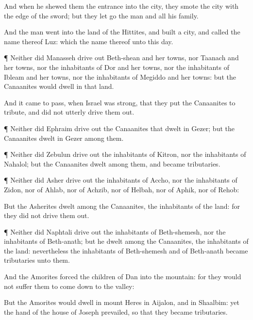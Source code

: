 {And when he
shewed them the
entrance into the
city, they
smote the
city with the
edge of the
sword; but they let
go the
man and all his
family.

And the
man
went into the
land of the
Hittites, and
built a
city, and
called the
name thereof
Luz: which
{} the
name thereof unto this
day.


\par }{\PP {}¶ Neither did
Manasseh drive
out
{}
Beth-shean and her
towns, nor
Taanach and her
towns, nor the
inhabitants of
Dor and her
towns, nor the
inhabitants of
Ibleam and her
towns, nor the
inhabitants of
Megiddo and her
towns: but the
Canaanites
would
dwell in that
land.

And it came to pass, when
Israel was
strong, that they
put the
Canaanites to
tribute, and did not
utterly drive them
out.


\par }{\PP {}¶ Neither did
Ephraim drive
out the
Canaanites that
dwelt in
Gezer; but the
Canaanites
dwelt in
Gezer
among them.


\par }{\PP {}¶ Neither did
Zebulun drive
out the
inhabitants of
Kitron, nor the
inhabitants of
Nahalol; but the
Canaanites
dwelt
among them, and became
tributaries.


\par }{\PP {}¶ Neither did
Asher drive
out the
inhabitants of
Accho, nor the
inhabitants of
Zidon, nor of
Ahlab, nor of
Achzib, nor of
Helbah, nor of
Aphik, nor of
Rehob:

But the
Asherites
dwelt
among the
Canaanites, the
inhabitants of the
land: for they did not drive them
out.


\par }{\PP {}¶ Neither did
Naphtali drive
out the
inhabitants of
Beth-shemesh, nor the
inhabitants of
Beth-anath; but he
dwelt
among the
Canaanites, the
inhabitants of the
land: nevertheless the
inhabitants of
Beth-shemesh and of
Beth-anath became
tributaries unto them.

And the
Amorites
forced the
children of
Dan into the
mountain: for they would not
suffer them to come
down to the
valley:

But the
Amorites
would
dwell in
mount
Heres in
Aijalon, and in
Shaalbim: yet the
hand of the
house of
Joseph
prevailed, so that they became
tributaries.

}
